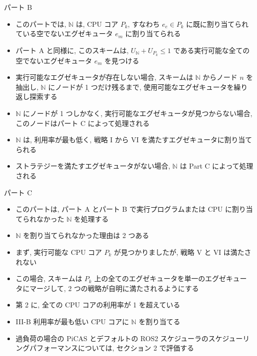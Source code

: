 \begin{frame}{パート B}
    \begin{itemize}
        \item このパートでは, $\mathbb{N}$ は, CPU コア $P_{k}$, すなわち $e_{e} \in P_{k}$ に既に割り当てられている空でないエグゼキュータ $e_{m}$ に割り当てられる
        \item パート A と同様に, このスキームは, $U_{\mathbb{N}}+U_{P_{k}} \leq 1$ である実行可能な全ての空でないエグゼキュータ $e_{m}$ を見つける
        \item 実行可能なエグゼキュータが存在しない場合, スキームは $\mathbb{N}$ からノード $n$ を抽出し, $\mathbb{N}$ にノードが 1 つだけ残るまで, 使用可能なエグゼキュータを繰り返し探索する
        \item $\mathbb{N}$ にノードが 1 つしかなく, 実行可能なエグゼキュータが見つからない場合, このノードはパート C によって処理される
        \item $\mathbb{N}$ は, 利用率が最も低く, 戦略 I から VI を満たすエグゼキュータに割り当てられる
        \item ストラテジーを満たすエグゼキュータがない場合, $\mathbb{N}$ は Part $\mathrm{C}$ によって処理される
    \end{itemize}
\end{frame}

\begin{frame}{パート C}
    \begin{itemize}
        \item このパートは, パート A とパート B で実行プログラムまたは CPU に割り当てられなかった $\mathbb{N}$ を処理する
        \item $\mathbb{N}$ を割り当てられなかった理由は 2 つある
        \item まず, 実行可能な CPU コア $P_{k}$ が見つかりましたが, 戦略 V と VI は満たされない
        \item この場合, スキームは $P_{k}$ 上の全てのエグゼキュータを単一のエグゼキュータにマージして, 2 つの戦略が自明に満たされるようにする
        \item 第 2 に, 全ての CPU コアの利用率が 1 を超えている
        \item III-B 利用率が最も低い CPU コアに $\mathbb{N}$ を割り当てる
        \item 過負荷の場合の PiCAS とデフォルトの ROS2 スケジューラのスケジューリングパフォーマンスについては, セクション 2 で評価する
    \end{itemize}
\end{frame}


